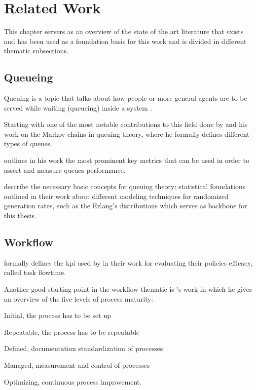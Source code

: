 \chapter{Related Work}
\label{ch:related_work}

This chapter servers as an overview of the state of the art literature that exists and has been used as a foundation basis for this work and is divided in different thematic subsections.

\section{Queueing}

Queuing is a topic that talks about how people or more general agents are to be served while waiting (\ie queueing) inside a system \citep{Kendall1953}.

Starting with one of the most notable contributions to this field done by \citet{Kendall1953} and his work on the Markov chains in queuing theory, where he formally defines different types of queues.

\citet{Pinedo2008} outlines in his work the most prominent key metrics that can be used in order to assert and measure queues performance.

\citet{Adan2016} describe the necessary basic concepts for queuing theory: statistical foundations outlined in their work about different modeling techniques for randomized generation rates, such as the Erlang's distributions which serves as backbone for this thesis.

\section{Workflow}
\label{sec:workflow}

\citet{Baker1974} formally defines the \gls{kpi} used by \citet{Zeng2005} in their work for evaluating their policies efficacy, called task flowtime.

Another good starting point in the workflow thematic is \citet{Macintosh1993}'s work in which he gives an overview of the five levels of process maturity:
\begin{enumerate*}
	\item Initial, the process has to be set up
	\item Repeatable, the process has to be repeatable
	\item Defined, documentation standardization of processes
	\item Managed, measurement and control of processes
	\item Optimizing, continuous process improvement.
\end{enumerate*}

